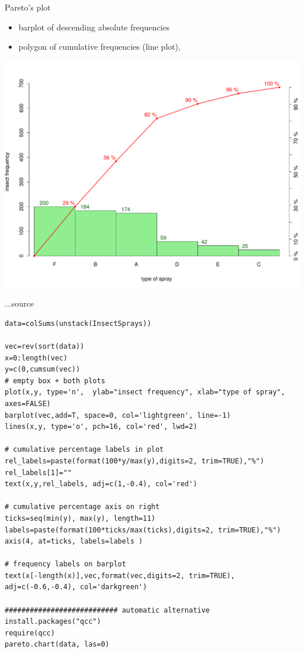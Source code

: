 \documentclass[smaller]{beamer}
\begin{document}
   

\begin{frame}{Pareto's plot}
\begin{itemize}
\item barplot of descending absolute frequencies
\item polygon of cumulative frequencies (line plot),\\
\end{itemize}
\includegraphics[scale=0.32]{01_pareto.pdf} 
\end{frame}

\begin{frame}[fragile]{...source}
\begin{Verbatim}[fontsize=\scriptsize]
data=colSums(unstack(InsectSprays))

vec=rev(sort(data))
x=0:length(vec)
y=c(0,cumsum(vec))
# empty box + both plots
plot(x,y, type='n',  ylab="insect frequency", xlab="type of spray", axes=FALSE)
barplot(vec,add=T, space=0, col='lightgreen', line=-1)
lines(x,y, type='o', pch=16, col='red', lwd=2)

# cumulative percentage labels in plot
rel_labels=paste(format(100*y/max(y),digits=2, trim=TRUE),"%")
rel_labels[1]=""
text(x,y,rel_labels, adj=c(1,-0.4), col='red')

# cumulative percentage axis on right
ticks=seq(min(y), max(y), length=11)
labels=paste(format(100*ticks/max(ticks),digits=2, trim=TRUE),"%")
axis(4, at=ticks, labels=labels )

# frequency labels on barplot
text(x[-length(x)],vec,format(vec,digits=2, trim=TRUE), adj=c(-0.6,-0.4), col='darkgreen')

########################### automatic alternative
install.packages("qcc")
require(qcc)
pareto.chart(data, las=0)
\end{Verbatim}
\end{frame}
\end{document}
